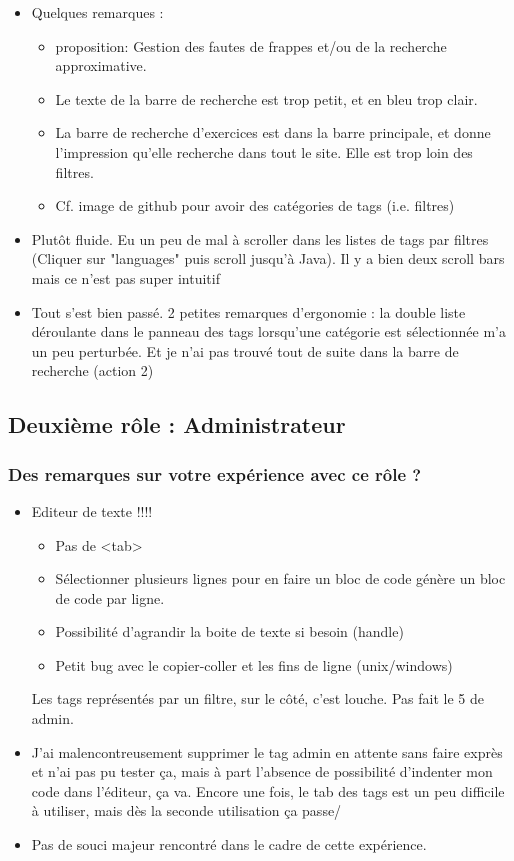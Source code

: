 \begin{itemize}
    \item Quelques remarques :
    \begin{itemize}
        \item proposition: Gestion des fautes de frappes et/ou de la recherche approximative.
        \item Le texte de la barre de recherche est trop petit, et en bleu trop clair.
        \item La barre de recherche d'exercices est dans la barre principale, et donne l'impression qu'elle recherche dans tout le site. Elle est trop loin des filtres.
        \item Cf. image de github pour avoir des catégories de tags (i.e. filtres)
    \end{itemize}
    \item Plutôt fluide. Eu un peu de mal à scroller dans les listes de tags par filtres (Cliquer sur "languages" puis scroll jusqu'à Java). Il y a bien deux scroll bars mais ce n'est pas super intuitif
    \item Tout s'est bien passé. 2 petites remarques d'ergonomie : la double liste déroulante dans le panneau des tags lorsqu'une catégorie est sélectionnée m'a un peu perturbée. Et je n'ai pas trouvé tout de suite dans la barre de recherche (action 2)
\end{itemize}


\subsection{Deuxième rôle : Administrateur}

\subsubsection*{Des remarques sur votre expérience avec ce rôle ?}

\begin{itemize}
    \item Editeur de texte !!!!
    \begin{itemize}
        \item Pas de <tab>
        \item Sélectionner plusieurs lignes pour en faire un bloc de code génère un bloc de code par ligne.
        \item Possibilité d'agrandir la boite de texte si besoin (handle)
        \item Petit bug avec le copier-coller et les fins de ligne (unix/windows)
    \end{itemize}
    Les tags représentés par un filtre, sur le côté, c'est louche. Pas fait le 5 de admin.
    \item J'ai malencontreusement supprimer le tag admin en attente sans faire exprès et n'ai pas pu tester ça, mais à part l'absence de possibilité d'indenter mon code dans l'éditeur, ça va. Encore une fois, le tab des tags est un peu difficile à utiliser, mais dès la seconde utilisation ça passe/
    \item Pas de souci majeur rencontré dans le cadre de cette expérience.
\end{itemize}


